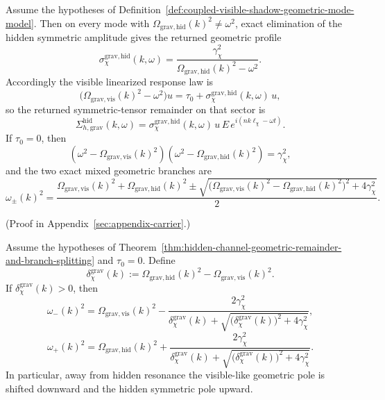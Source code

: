 \begin{theorem}
\label{thm:hidden-channel-geometric-remainder-and-branch-splitting}
Assume the hypotheses of
Definition~\ref{def:coupled-visible-shadow-geometric-mode-model}. Then on
every mode with \(\Omega_{\mathrm{grav,hid}}(k)^2\neq\omega^2\), exact
elimination of the hidden symmetric amplitude gives the returned geometric
profile
\[
\sigma_{\chi}^{\mathrm{grav,hid}}(k,\omega)
=
\frac{\gamma_{\chi}^2}{
\Omega_{\mathrm{grav,hid}}(k)^2-\omega^2
}.
\]
Accordingly the visible linearized response law is
\[
\bigl(\Omega_{\mathrm{grav,vis}}(k)^2-\omega^2\bigr)u
=
\tau_0+\sigma_{\chi}^{\mathrm{grav,hid}}(k,\omega)\,u,
\]
so the returned symmetric-tensor remainder on that sector is
\[
\Sigma_{h,\mathrm{grav}}^{\mathrm{hid}}(k,\omega)
=
\sigma_{\chi}^{\mathrm{grav,hid}}(k,\omega)\,
u\,E\,e^{i(nk\ell_{\chi}-\omega t)}.
\]
If \(\tau_0=0\), then
\[
(\omega^2-\Omega_{\mathrm{grav,vis}}(k)^2)
(\omega^2-\Omega_{\mathrm{grav,hid}}(k)^2)
=
\gamma_{\chi}^2,
\]
and the two exact mixed geometric branches are
\[
\omega_{\pm}(k)^2
=
\frac{
\Omega_{\mathrm{grav,vis}}(k)^2+\Omega_{\mathrm{grav,hid}}(k)^2
\pm
\sqrt{
\bigl(\Omega_{\mathrm{grav,vis}}(k)^2-\Omega_{\mathrm{grav,hid}}(k)^2\bigr)^2
+
4\gamma_{\chi}^2
}
}{2}.
\]
\end{theorem}

(Proof in Appendix~\ref{sec:appendix-carrier}.)

\begin{corollary}
\label{cor:exact-off-resonant-geometric-pole-shifts}
Assume the hypotheses of
Theorem~\ref{thm:hidden-channel-geometric-remainder-and-branch-splitting} and
\(\tau_0=0\). Define
\[
\delta_{\chi}^{\mathrm{grav}}(k)
:=
\Omega_{\mathrm{grav,hid}}(k)^2-\Omega_{\mathrm{grav,vis}}(k)^2.
\]
If \(\delta_{\chi}^{\mathrm{grav}}(k)>0\), then
\[
\omega_-(k)^2
=
\Omega_{\mathrm{grav,vis}}(k)^2
-
\frac{2\gamma_{\chi}^2}{
\delta_{\chi}^{\mathrm{grav}}(k)
+
\sqrt{
\bigl(\delta_{\chi}^{\mathrm{grav}}(k)\bigr)^2+4\gamma_{\chi}^2
}
},
\]
\[
\omega_+(k)^2
=
\Omega_{\mathrm{grav,hid}}(k)^2
+
\frac{2\gamma_{\chi}^2}{
\delta_{\chi}^{\mathrm{grav}}(k)
+
\sqrt{
\bigl(\delta_{\chi}^{\mathrm{grav}}(k)\bigr)^2+4\gamma_{\chi}^2
}
}.
\]
In particular, away from hidden resonance the visible-like geometric pole is
shifted downward and the hidden symmetric pole upward.
\end{corollary}

